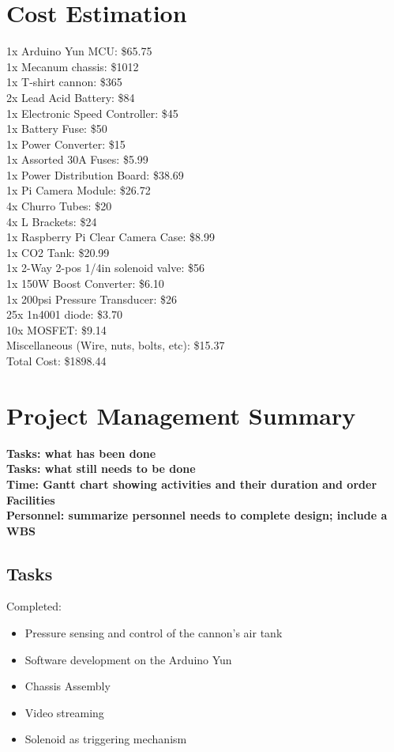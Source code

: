 \documentclass[letterpaper,12pt]{article}
\newcommand{\xxx}[1]{{\color{red}\bf #1}}
\begin{document}
\section{Cost Estimation}

\label{sec:cost}
1x Arduino Yun MCU: \$65.75 \\
1x Mecanum chassis: \$1012 \\
1x T-shirt cannon: \$365 \\
2x Lead Acid Battery: \$84 \\
1x Electronic Speed Controller: \$45 \\
1x Battery Fuse: \$50 \\
1x Power Converter: \$15 \\
1x Assorted 30A Fuses: \$5.99 \\
1x Power Distribution Board: \$38.69 \\
1x Pi Camera Module: \$26.72 \\
4x Churro Tubes: \$20 \\
4x L Brackets: \$24 \\
1x Raspberry Pi Clear Camera Case: \$8.99 \\
1x CO2 Tank: \$20.99 \\
1x 2-Way 2-pos 1/4in solenoid valve: \$56 \\
1x 150W Boost Converter: \$6.10 \\
1x 200psi Pressure Transducer: \$26 \\
25x 1n4001 diode: \$3.70 \\
10x MOSFET: \$9.14 \\

Miscellaneous (Wire, nuts, bolts, etc): \$15.37 \\

Total Cost: \$1898.44

\section{Project Management Summary}
\label{sec:projman}

\xxx{Tasks: what has been done} \\
\xxx{Tasks: what still needs to be done} \\
\xxx{Time: Gantt chart showing activities and their duration and order} \\
\xxx{Facilities} \\
\xxx{Personnel: summarize personnel needs to complete design; include a WBS}

\subsection{Tasks}
Completed:
\begin{itemize}
    \item Pressure sensing and control of the cannon's air tank
    \item Software development on the Arduino Yun
    \item Chassis Assembly
    \item Video streaming
    \item Solenoid as triggering mechanism
\end{itemize}
\end{document}
